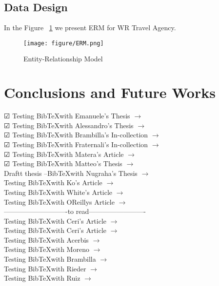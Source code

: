 \documentclass[a4paper]{memoir}
\begin{document}
\section{Data Design}
In the Figure ~\ref{fig:ERM} we present \ac{ERM} for WR Travel Agency.
	\begin{figure}[here]
		\texttt{[image: figure/ERM.png]}
		\caption{Entity-Relationship Model}
		\label{fig:ERM}
	\end{figure}

\chapter{Conclusions and Future Works} %
\label{chap:Conclusions and Future Works}
$\CheckedBox$ Testing Bib\TeX with Emanuele's Thesis $\rightarrow$ \cite{Andreis2010}\\
$\CheckedBox$ Testing Bib\TeX with Alessandro's Thesis $\rightarrow$ \cite{Bozzon2009}\\
$\CheckedBox$ Testing Bib\TeX with Brambilla's In-collection $\rightarrow$ \cite{Brambilla}\\
$\CheckedBox$ Testing Bib\TeX with Fraternali's In-collection $\rightarrow$ \cite{Fraternali2010}\\
$\CheckedBox$ Testing Bib\TeX with Matera's Article $\rightarrow$ \cite{Matera2003}\\
$\CheckedBox$ Testing Bib\TeX with Matteo's Thesis $\rightarrow$ \cite{Frattini2007}\\
Draftt thesis --Bib\TeX with Nugraha's Thesis $\rightarrow$ \cite{Nugraha2007}\\
Testing Bib\TeX with Ko's Article $\rightarrow$ \cite{Ko2010}\\
Testing Bib\TeX with White's Article $\rightarrow$ \cite{White2004}\\
Testing Bib\TeX with OReillys Article $\rightarrow$ \cite{O'Reilly2007}\\



----------------------------to read-------------------------\\
Testing Bib\TeX with Ceri's Article $\rightarrow$ \cite{Ceri2010}\\
Testing Bib\TeX with Ceri's Article $\rightarrow$ \cite{Ceri2001}\\
Testing Bib\TeX with Acerbis $\rightarrow$ \cite{Acerbis2007}\\
Testing Bib\TeX with Moreno $\rightarrow$ \cite{Moreno2006}\\
Testing Bib\TeX with Brambilla $\rightarrow$ \cite{Brambilla2006}\\
Testing Bib\TeX with Rieder $\rightarrow$ \cite{Rieder2009}\\
Testing Bib\TeX with Ruiz $\rightarrow$ \cite{Ruiz2010}\\
\end{document}
